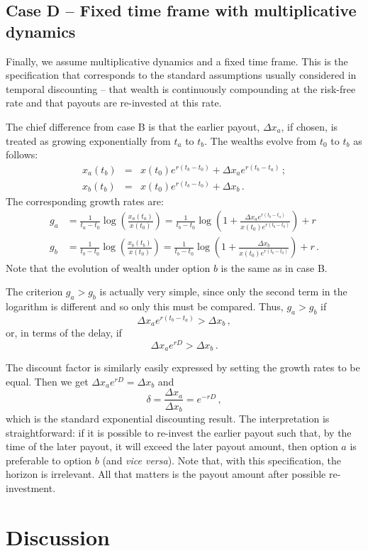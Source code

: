 \documentclass[11pt]{article}
\newcommand{\be}{\begin{equation}}
\newcommand{\ee}{\end{equation}}
\newcommand{\bea}{\begin{eqnarray}}
\newcommand{\eea}{\end{eqnarray}}
\newcommand{\Dx}{\Delta x}
\newcommand{\del}{D}
\numberwithin{equation}{section}
\begin{document}
\subsection{Case D -- Fixed time frame with multiplicative dynamics}\label{sec:case_D}

Finally, we assume multiplicative dynamics and a fixed time frame. This is the specification that corresponds to the standard assumptions usually considered in temporal discounting -- that wealth is continuously compounding at the risk-free rate and that payouts are re-invested at this rate.

The chief difference from case B is that the earlier payout, $\Dx_a$, if chosen, is treated as growing exponentially from $t_a$ to $t_b$. The wealths evolve from $t_0$ to $t_b$ as follows:
\bea
x_a\left(t_b\right) &=& x\left(t_0\right) e^{r(t_b-t_0)} + \Dx_a e^{r(t_b-t_a)}\,;\\
x_b\left(t_b\right) &=& x\left(t_0\right) e^{r(t_b-t_0)} + \Dx_b\,.
\eea
The corresponding growth rates are:
\bea
g_a &= \frac{1}{t_a-t_0} \log{\left(\frac{x_a\left(t_a\right)}{x\left(t_0\right)}\right)} = \frac{1}{t_b-t_0}\log{\left(1 + \frac{\Dx_a e^{r(t_b-t_a)}}{x\left(t_0\right)e^{r(t_b-t_0)}}\right)} + r\\
g_b &= \frac{1}{t_b-t_0} \log{\left(\frac{x_b\left(t_b\right)}{x\left(t_0\right)}\right)} = \frac{1}{t_b-t_0}\log{\left(1 + \frac{\Dx_b}{x\left(t_0\right)e^{r(t_b-t_0)}}\right)} + r\,.
\eea
Note that the evolution of wealth under option $b$ is the same as in case B.


The criterion $g_a > g_b$ is actually very simple, since only the second term in the logarithm is different and so only this must be compared. Thus, $g_a > g_b$ if
\be
\Dx_a e^{r(t_b-t_a)} > \Dx_b\,,
\ee
or, in terms of the delay, if
\be
\Dx_a e^{r\del} > \Dx_b\,.
\ee

The discount factor is similarly easily expressed by setting the growth rates to be equal. Then we get $\Dx_a e^{r\del} = \Dx_b$ and
\be
\delta = \frac{\Dx_a}{\Dx_b} = e^{-r\del}\,,
\ee
which is the standard exponential discounting result. The interpretation is straightforward: if it is possible to re-invest the earlier payout such that, by the time of the later payout, it will exceed the later payout amount, then option $a$ is preferable to option $b$ (and \textit{vice versa}). Note that, with this specification, the horizon is irrelevant. All that matters is the payout amount after possible re-investment.

\section{Discussion}\label{sec:discussion}
\end{document}
